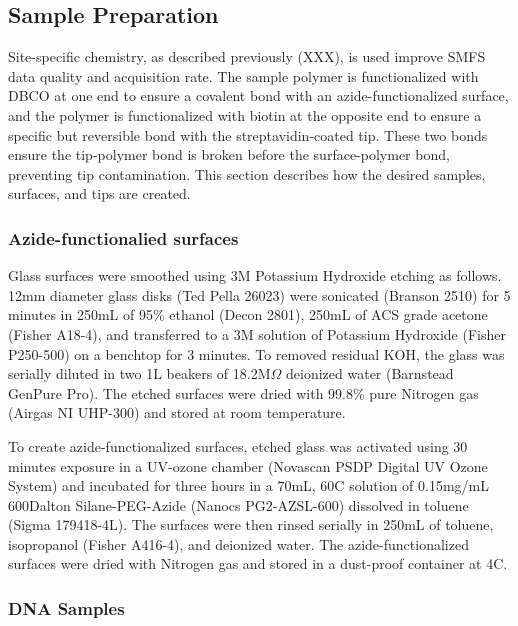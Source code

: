 \documentclass[%
  aip,12pt,tightenlines,
  amsthm,
 amsmath,amssymb
]{article}
\newcommand{\sLabel}[1]{\label{section:#1}}
\newcommand{\firstp}[0]{}
\newcommand{\pl}[0]{\vspace{6pt}}
\newcommand{\supply}[2]{(#1 #2)}
\newcommand{\singlemol}[0]{SMFS}
\newcommand{\degreeC}[0]{\degree{}C}
\begin{document}
\subsection{Sample Preparation}

Site-specific chemistry, as described previously (XXX), is used improve \singlemol{} data quality and acquisition rate. The sample polymer is functionalized with DBCO at one end to ensure a covalent bond with an azide-functionalized surface, and the polymer is functionalized with biotin at the opposite end to ensure a specific but reversible bond with the streptavidin-coated tip. These two bonds ensure the tip-polymer bond is broken before the surface-polymer bond, preventing tip contamination. This section describes how the desired samples, surfaces, and tips are created.

\subsubsection{\sLabel{Surface}Azide-functionalied surfaces}

\firstp Glass surfaces were smoothed using 3M Potassium Hydroxide etching as follows. 12mm diameter glass disks \supply{Ted Pella}{26023} were sonicated \supply{Branson}{2510} for 5 minutes in 250mL of 95\% ethanol \supply{Decon}{2801}, 250mL of ACS grade acetone \supply{Fisher}{A18-4}, and transferred to a 3M solution of Potassium Hydroxide \supply{Fisher}{P250-500} on a benchtop for 3 minutes. To removed residual KOH, the glass was serially diluted in two 1L beakers of 18.2M$\Omega$ deionized water \supply{Barnstead}{GenPure Pro}. The etched surfaces were dried with 99.8\% pure Nitrogen gas \supply{Airgas}{NI UHP-300} and stored at room temperature. \pl

To create azide-functionalized surfaces, etched glass was activated using 30 minutes exposure in a UV-ozone chamber \supply{Novascan}{PSDP Digital UV Ozone System} and incubated for three hours in a 70mL, 60\degreeC{} solution of 0.15mg/mL 600Dalton Silane-PEG-Azide \supply{Nanocs}{PG2-AZSL-600} dissolved in toluene \supply{Sigma}{179418-4L}. The surfaces were then rinsed serially in 250mL of toluene, isopropanol \supply{Fisher}{A416-4}, and deionized water. The azide-functionalized surfaces were dried with Nitrogen gas and stored in a dust-proof container at 4\degreeC{}. \pl 

\subsubsection{\sLabel{Sample}DNA Samples}
\end{document}
